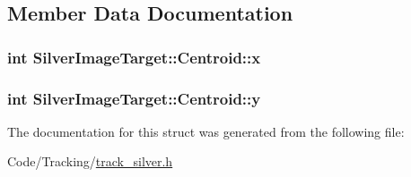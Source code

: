 \subsection{\-Member \-Data \-Documentation}
\hypertarget{struct_silver_image_target_1_1_centroid_abd7c429a2c46626db04c8a973b19e31d}{
\subsubsection[{x}]{\setlength{\rightskip}{0pt plus 5cm}int {\bf \-Silver\-Image\-Target\-::\-Centroid\-::x}}}\label{struct_silver_image_target_1_1_centroid_abd7c429a2c46626db04c8a973b19e31d}
\hypertarget{struct_silver_image_target_1_1_centroid_a2363c14312ab1437ae52f8dc3b8f46c3}{
\subsubsection[{y}]{\setlength{\rightskip}{0pt plus 5cm}int {\bf \-Silver\-Image\-Target\-::\-Centroid\-::y}}}\label{struct_silver_image_target_1_1_centroid_a2363c14312ab1437ae52f8dc3b8f46c3}


\-The documentation for this struct was generated from the following file\-:\begin{DoxyCompactItemize}
\item 
\-Code/\-Tracking/\hyperlink{track__silver_8h}{track\-\_\-silver.\-h}\end{DoxyCompactItemize}
